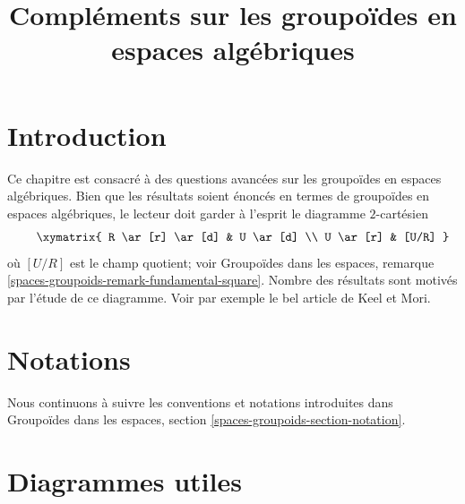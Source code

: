 

%


\title{Compléments sur les groupoïdes en espaces algébriques}


\maketitle

\label{section-phantom}

\tableofcontents

\section{Introduction}
\label{section-introduction}

\noindent
Ce chapitre est consacré à des questions avancées sur les groupoïdes
en espaces algébriques.
Bien que les résultats soient énoncés en termes de groupoïdes en
espaces algébriques, le
lecteur doit garder à l'esprit le diagramme $2$-cartésien
\begin{equation}
\label{equation-quotient-stack}
\vcenter{
\xymatrix{
R \ar[r] \ar[d] & U \ar[d] \\
U \ar[r] & [U/R]
}
}
\end{equation}
où $[U/R]$ est le champ quotient; voir
Groupoïdes dans les espaces, remarque \ref{spaces-groupoids-remark-fundamental-square}.
Nombre des résultats sont motivés par l'étude de ce diagramme.
Voir par exemple le bel article \cite{K-M} de Keel et Mori.





\section{Notations}
\label{section-notation}

\noindent
Nous continuons à suivre les conventions et notations introduites dans
Groupoïdes dans les espaces, section \ref{spaces-groupoids-section-notation}.





\section{Diagrammes utiles}
\label{section-diagrams}

